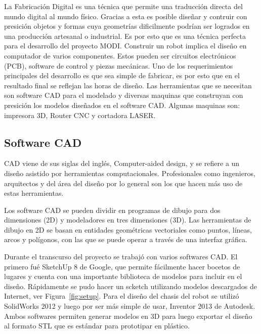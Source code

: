 La Fabricación Digital es una técnica que permite una traducción directa del mundo digital al mundo físico. Gracias a esta es posible diseñar y contruir con presición objetos y formas cuya geometrías dificilmente podrían ser logrados en una producción artesanal o industrial. Es por esto que es una técnica perfecta para el desarrollo del proyecto MODI. Construir un robot implica el diseño en computador de varios componentes. Estos pueden ser circuitos electrónicos (PCB), software de control y piezas mecánicas. Uno de los requerimientos principales del desarrollo es que sea simple de fabricar, es por esto que en el resultado final se reflejan las horas de diseño. Las herramientas que se necesitan son software CAD para el modelado y diversas maquinas que construyan con presición los modelos diseñados en el software CAD. Algunas maquinas son: impresora 3D, Router CNC y cortadora LASER.




\subsection{Software CAD}

CAD viene de sus siglas del inglés, Computer-aided design, y se refiere a un diseño asistido por herramientas computacionales. Profesionales como ingenieros, arquitectos y del área del diseño por lo general son los que hacen más uso de estas herramientas.

Los software CAD se pueden dividir en programas de dibujo para dos dimensiones (2D) y modeladores en tres dimensiones (3D). Las herramientas de dibujo en 2D se basan en entidades geométricas vectoriales como puntos, líneas, arcos y polígonos, con las que se puede operar a través de una interfaz gráfica.

Durante el transcurso del proyecto se trabajó con varios softwares CAD. El primero fué SketchUp 8 de Google, que permite fácilmente hacer bocetos de lugares y cuenta con una importante biblioteca de modelos para incluir en el diseño. Rápidamente se pudo hacer un scketch utilizando modelos descargados de Internet, ver Figura~\ref{fig:setup}. Para el diseño del chasis del robot se utilizó SolidWorks 2012 y luego por ser más simple de usar, Inventor 2013 de Autodesk. Ambos softwares permiten generar modelos en 3D para luego exportar el diseño al formato STL que es estándar para prototipar en plástico. 




